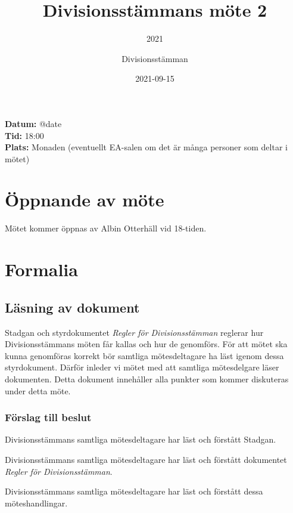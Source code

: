 \documentclass[protokoll]{dvd}
\begin{document}
\title{Divisionsstämmans möte 2}
\subtitle{2021}
\author{Divisionsstämman}
\date{2021-09-15}

\textbf{Datum:} \csname @date\endcsname\\
\textbf{Tid:} 18:00\\
\textbf{Plats:} Monaden (eventuellt EA-salen om det är många personer som deltar i mötet)

\section{Öppnande av möte}

Mötet kommer öppnas av Albin Otterhäll vid 18-tiden.

\newpage
\section{Formalia}

\subsection{Läsning av dokument}

Stadgan och styrdokumentet \emph{Regler för Divisionsstämman} reglerar hur Divisionsstämmans möten får kallas och hur de genomförs.
För att mötet ska kunna genomföras korrekt bör samtliga mötesdeltagare ha läst igenom dessa styrdokument.
Därför inleder vi mötet med att samtliga mötesdelgare läser dokumenten.
Detta dokument innehåller alla punkter som kommer diskuteras under detta möte.

\subsubsection*{Förslag till beslut}

\begin{attsatser}
	\item Divisionsstämmans samtliga mötesdeltagare har läst och förstått Stadgan.
	\item Divisionsstämmans samtliga mötesdeltagare har läst och förstått dokumentet \emph{Regler för Divisionsstämman}.
	\item Divisionsstämmans samtliga mötesdeltagare har läst och förstått dessa möteshandlingar.
\end{attsatser}
\end{document}
